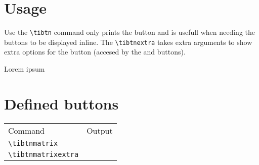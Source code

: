 \documentclass[a4paper,12pt]{article}
\newcommand{\printcmd}[1]{\texttt{\textbackslash #1}}
\begin{document}
\section{Usage}

Use the \printcmd{tibtn} command only prints the button and is usefull when
needing the buttons to be displayed inline. The \printcmd{tibtnextra} takes
extra arguments to show extra options for the button (accesed by the
\tibtnsecond{} and \tibtnalpha{} buttons).

\begin{SideBySideExample}[xrightmargin=5.5cm]

Lorem
ipsum
\end{SideBySideExample}

\section{Defined buttons}

\begin{center}
	\begin{tabular}{|>{\ttfamily}l|l|}
		\multicolumn{2}{c}{\textbf{Defined buttons}}      \\ \hline
		\textnormal{Command}        & Output              \\ \hline
		\printcmd{tibtnmatrix}      & \tibtnmatrix{}      \\ \hline
		\printcmd{tibtnmatrixextra} & \tibtnmatrixextra{} \\ \hline
	\end{tabular}
\end{center}
\end{document}

